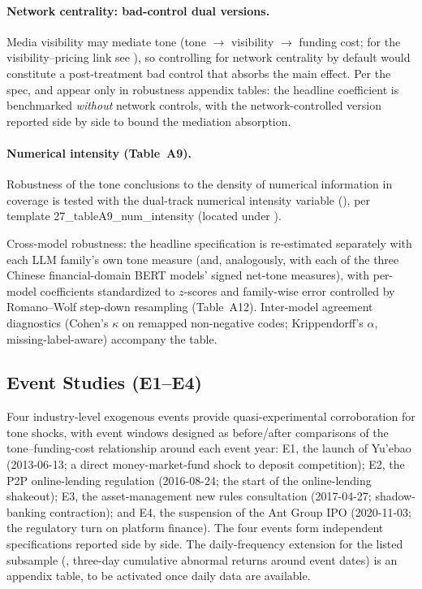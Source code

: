 \paragraph{Network centrality: bad-control dual versions.}
Media visibility may mediate tone (tone $\to$ visibility $\to$ funding
cost; for the visibility--pricing link see
\textcite{fangperess2009media}), so controlling for network centrality
by default would constitute a post-treatment bad control that absorbs
the main effect. Per the spec,  and
 appear only in robustness appendix tables:
the headline coefficient is benchmarked \emph{without} network
controls, with the network-controlled version reported side by side to
bound the mediation absorption.

\paragraph{Numerical intensity (Table~A9).}
Robustness of the tone conclusions to the density of numerical
information in coverage is tested with the dual-track numerical
intensity variable (), per template
27\_tableA9\_num\_intensity (located under
).

Cross-model robustness: the headline specification is re-estimated
separately with each LLM family's own tone measure (and, analogously,
with each of the three Chinese financial-domain BERT models'
signed net-tone measures), with per-model coefficients standardized to
$z$-scores and family-wise error controlled by Romano--Wolf step-down
resampling (Table~A12). Inter-model agreement diagnostics
(Cohen's $\kappa$ on remapped non-negative codes; Krippendorff's
$\alpha$, missing-label-aware) accompany the table.

\subsection{Event Studies (E1--E4)}
Four industry-level exogenous events provide quasi-experimental
corroboration for tone shocks, with event windows designed as
before/after comparisons of the tone--funding-cost relationship around
each event year: E1, the launch of Yu'ebao (2013-06-13; a direct
money-market-fund shock to deposit competition); E2, the P2P
online-lending regulation (2016-08-24; the start of the online-lending
shakeout); E3, the asset-management new rules consultation
(2017-04-27; shadow-banking contraction); and E4, the suspension of
the Ant Group IPO (2020-11-03; the regulatory turn on platform
finance). The four events form independent specifications reported
side by side. The daily-frequency extension for the listed subsample
(, three-day cumulative abnormal
returns around event dates) is an appendix table, to be activated once
daily data are available.

